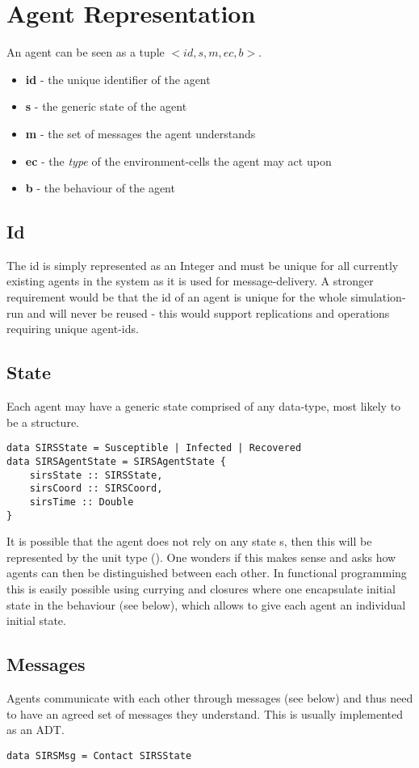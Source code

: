 \section{Agent Representation}
An agent can be seen as a tuple $<id, s, m, ec, b>$.
\begin{itemize}
	\item \textbf{id} - the unique identifier of the agent
	\item \textbf{s} - the generic state of the agent
	\item \textbf{m} - the set of messages the agent understands
	\item \textbf{ec} - the \textit{type} of the environment-cells the agent may act upon
	\item \textbf{b} - the behaviour of the agent
\end{itemize}

\subsection{Id}
The id is simply represented as an Integer and must be unique for all currently existing agents in the system as it is used for message-delivery. A stronger requirement would be that the id of an agent is unique for the whole simulation-run and will never be reused - this would support replications and operations requiring unique agent-ids.

\subsection{State}
Each agent may have a generic state comprised of any data-type, most likely to be a structure.
\begin{lstlisting}[]
data SIRSState = Susceptible | Infected | Recovered
data SIRSAgentState = SIRSAgentState {
    sirsState :: SIRSState,
    sirsCoord :: SIRSCoord,
    sirsTime :: Double
} 
\end{lstlisting}

It is possible that the agent does not rely on any state s, then this will be represented by the unit type (). One wonders if this makes sense and asks how agents can then be distinguished between each other. In functional programming this is easily possible using currying and closures where one encapsulate initial state in the behaviour (see below), which allows to give each agent an individual initial state.

\subsection{Messages}
Agents communicate with each other through messages (see below) and thus need to have an agreed set of messages they understand. This is usually implemented as an ADT.
\begin{lstlisting}[]
data SIRSMsg = Contact SIRSState
\end{lstlisting}

